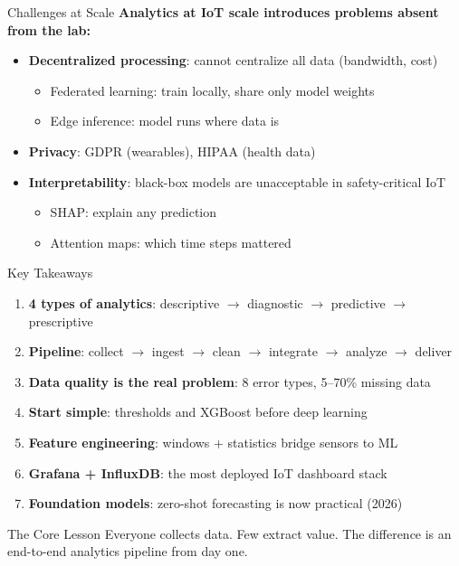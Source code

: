 \documentclass[aspectratio=169,11pt]{beamer}
\begin{document}

\begin{frame}{Challenges at Scale}
    \textbf{Analytics at IoT scale introduces problems absent from the lab:}

    \vspace{0.3cm}
    \begin{itemize}
        \item \textbf{Decentralized processing}: cannot centralize all data (bandwidth, cost)
        \begin{itemize}
            \item Federated learning: train locally, share only model weights
            \item Edge inference: model runs where data is
        \end{itemize}
        \item \textbf{Privacy}: GDPR (wearables), HIPAA (health data)
        \item \textbf{Interpretability}: black-box models are unacceptable in safety-critical IoT
        \begin{itemize}
            \item SHAP: explain any prediction
            \item Attention maps: which time steps mattered
        \end{itemize}
    \end{itemize}
\end{frame}

\begin{frame}{Key Takeaways}
    \begin{enumerate}
        \item \textbf{4 types of analytics}: descriptive $\rightarrow$ diagnostic $\rightarrow$ predictive $\rightarrow$ prescriptive
        \item \textbf{Pipeline}: collect $\rightarrow$ ingest $\rightarrow$ clean $\rightarrow$ integrate $\rightarrow$ analyze $\rightarrow$ deliver
        \item \textbf{Data quality is the real problem}: 8 error types, 5--70\% missing data
        \item \textbf{Start simple}: thresholds and XGBoost before deep learning
        \item \textbf{Feature engineering}: windows + statistics bridge sensors to ML
        \item \textbf{Grafana + InfluxDB}: the most deployed IoT dashboard stack
        \item \textbf{Foundation models}: zero-shot forecasting is now practical (2026)
    \end{enumerate}

    \vspace{0.3cm}
    \begin{block}{The Core Lesson}
        Everyone collects data. Few extract value. The difference is an end-to-end analytics pipeline from day one.
    \end{block}
\end{frame}
\end{document}
